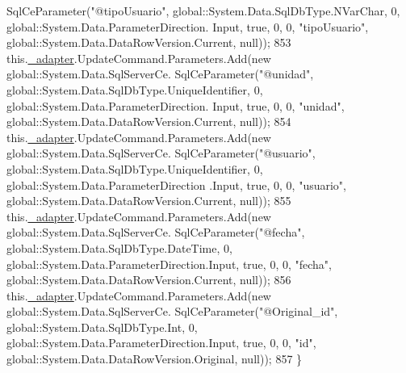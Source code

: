 \begin{DoxyCode}
      SqlCeParameter(\textcolor{stringliteral}{"@tipoUsuario"}, global::System.Data.SqlDbType.NVarChar, 0, global::System.Data.ParameterDirection.
      Input, \textcolor{keyword}{true}, 0, 0, \textcolor{stringliteral}{"tipoUsuario"}, global::System.Data.DataRowVersion.Current, null));
853             this.\hyperlink{class_proyecto___integrador__3_1_1ds_servicios_table_adapters_1_1_servicios_table_adapter_adef36d1c06bafba740cd2cb94515689b}{\_adapter}.UpdateCommand.Parameters.Add(\textcolor{keyword}{new} global::System.Data.SqlServerCe.
      SqlCeParameter(\textcolor{stringliteral}{"@unidad"}, global::System.Data.SqlDbType.UniqueIdentifier, 0, global::System.Data.ParameterDirection.
      Input, \textcolor{keyword}{true}, 0, 0, \textcolor{stringliteral}{"unidad"}, global::System.Data.DataRowVersion.Current, null));
854             this.\hyperlink{class_proyecto___integrador__3_1_1ds_servicios_table_adapters_1_1_servicios_table_adapter_adef36d1c06bafba740cd2cb94515689b}{\_adapter}.UpdateCommand.Parameters.Add(\textcolor{keyword}{new} global::System.Data.SqlServerCe.
      SqlCeParameter(\textcolor{stringliteral}{"@usuario"}, global::System.Data.SqlDbType.UniqueIdentifier, 0, global::System.Data.ParameterDirection
      .Input, \textcolor{keyword}{true}, 0, 0, \textcolor{stringliteral}{"usuario"}, global::System.Data.DataRowVersion.Current, null));
855             this.\hyperlink{class_proyecto___integrador__3_1_1ds_servicios_table_adapters_1_1_servicios_table_adapter_adef36d1c06bafba740cd2cb94515689b}{\_adapter}.UpdateCommand.Parameters.Add(\textcolor{keyword}{new} global::System.Data.SqlServerCe.
      SqlCeParameter(\textcolor{stringliteral}{"@fecha"}, global::System.Data.SqlDbType.DateTime, 0, global::System.Data.ParameterDirection.Input, \textcolor{keyword}{
      true}, 0, 0, \textcolor{stringliteral}{"fecha"}, global::System.Data.DataRowVersion.Current, null));
856             this.\hyperlink{class_proyecto___integrador__3_1_1ds_servicios_table_adapters_1_1_servicios_table_adapter_adef36d1c06bafba740cd2cb94515689b}{\_adapter}.UpdateCommand.Parameters.Add(\textcolor{keyword}{new} global::System.Data.SqlServerCe.
      SqlCeParameter(\textcolor{stringliteral}{"@Original\_id"}, global::System.Data.SqlDbType.Int, 0, global::System.Data.ParameterDirection.Input, \textcolor{keyword}{
      true}, 0, 0, \textcolor{stringliteral}{"id"}, global::System.Data.DataRowVersion.Original, null));
857         \}
\end{DoxyCode}
